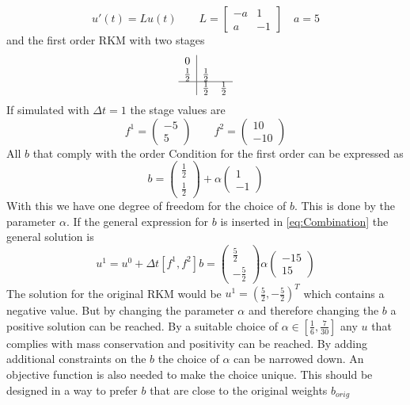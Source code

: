 \documentclass[a4paper]{scrartcl}
\numberwithin{equation}{section}
\theoremstyle{plain}
\theoremstyle{definition}
\numberwithin{theorem}{section}
\newcommand{\dt}{{\Delta t}}
\newcommand{\1}{\mathbbm{1}}
\begin{document}
\begin{equation}
u'(t) = L u(t) \qquad L = \left[\begin{matrix}- a & 1\\a & -1\end{matrix}\right] \quad a =5
\end{equation}
and the first order RKM with two stages
\begin{align}
\begin{array}{c|cc}
0 &  & \\
\frac{1}{2} & \frac{1}{2} & \\
\hline
 & \frac{1}{2} & \frac{1}{2}\\
\end{array}
\end{align}
If simulated with $\dt = 1$ the stage values are 
\begin{equation}
f^1 = \left(\begin{matrix}-5\\5\end{matrix}\right) \qquad f^2 = \left(\begin{matrix}10\\-10\end{matrix}\right)
\end{equation}
All $b$ that comply with the order Condition for the first order can be expressed as
\begin{equation}
b= \left(\begin{matrix}\frac{1}{2}\\ \frac{1}{2}\end{matrix}\right) + \alpha \left(\begin{matrix}1\\ -1\end{matrix}\right)
\end{equation}
With this we have one degree of freedom for the choice of $b$. This is done by the parameter $\alpha$.
If the general expression for $b$ is inserted in \eqref{eq:Combination} the general solution is 
\begin{equation}
u^{1} = u^0 + \dt  \left[f^1,f^2\right] b = \left(\begin{matrix}\frac{5}{2}\\- \frac{5}{2}\end{matrix}\right) \alpha  \left(\begin{matrix}-15\\15\end{matrix}\right)
\end{equation}
The solution for the original RKM would be $u^{1} = \left(\frac{5}{2} ,- \frac{5}{2}\right)^T$ which contains a negative value. But by changing the parameter $\alpha$ and therefore changing the $b$ a positive solution can be reached.
By a suitable choice of $\alpha \in \left[\frac{1}{6},\frac{7}{30}\right]$ any $u$ that complies with mass conservation and positivity can be reached. 
By adding additional constraints on the $b$ the choice of $\alpha$ can be narrowed down. 
An objective function is also needed to make the choice unique. This should be designed in a way to prefer $b$ that are close to the original weights $b_{orig}$
\end{document}
